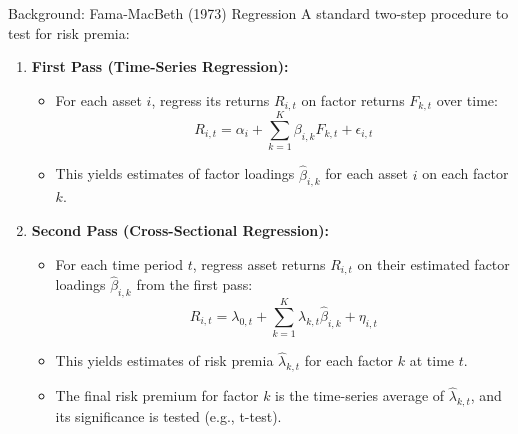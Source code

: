 \documentclass[10pt]{beamer}
\begin{document}
\begin{frame}{Background: Fama-MacBeth (1973) Regression}
  A standard two-step procedure to test for risk premia:
  \begin{enumerate}
    \item \textbf{First Pass (Time-Series Regression):}
      \begin{itemize}
        \item For each asset $i$, regress its returns $R_{i,t}$ on factor returns $F_{k,t}$ over time:
              \[ R_{i,t} = \alpha_i + \sum_{k=1}^{K} \beta_{i,k} F_{k,t} + \epsilon_{i,t} \]
        \item This yields estimates of factor loadings $\hat{\beta}_{i,k}$ for each asset $i$ on each factor $k$.
      \end{itemize}
    \item \textbf{Second Pass (Cross-Sectional Regression):}
      \begin{itemize}
        \item For each time period $t$, regress asset returns $R_{i,t}$ on their estimated factor loadings $\hat{\beta}_{i,k}$ from the first pass:
              \[ R_{i,t} = \lambda_{0,t} + \sum_{k=1}^{K} \lambda_{k,t} \hat{\beta}_{i,k} + \eta_{i,t} \]
        \item This yields estimates of risk premia $\hat{\lambda}_{k,t}$ for each factor $k$ at time $t$.
        \item The final risk premium for factor $k$ is the time-series average of $\hat{\lambda}_{k,t}$, and its significance is tested (e.g., t-test).
      \end{itemize}
  \end{enumerate}
\end{frame}
\end{document}
